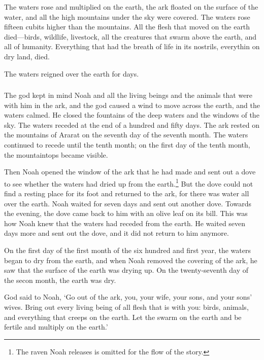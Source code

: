 The waters rose and multiplied on the earth,
the ark floated on the surface of the water,
and all the high mountains under the sky were covered.
The waters rose fifteen cubits higher than the mountains. 
All the flesh that moved on the earth died---birds,
wildlife, livestock, all the creatures that swarm above the earth,
and all of humanity.
Everything that had the breath of life in its nostrils, 
everythin on dry land,
died.

The waters reigned over the earth for  days.


\subsubsection{\secsep}

The god kept in mind Noah and all the living beings 
and the animals that were with him in the ark,
and the god caused a wind to move across the earth,
and the waters calmed.
He closed the fountains of the deep waters 
and the windows of the sky.
The waters receded at the end of a hundred and fifty days. 
The ark rested on the mountains of Ararat 
on the seventh day of the seventh month.
The waters continued to recede until the tenth month;
on the first day of the tenth month, 
the mountaintops became visible.

Then Noah opened the window of the ark that he had made
and sent out a dove to see 
whether the waters had dried up from the earth.\footnote{The raven Noah releases is omitted for the flow of the story.}
But the dove could not find a resting place for its foot
and returned to the ark, 
for there was water all over the earth.
Noah waited for seven days and sent out another dove.
Towards the evening,
the dove came back to him with an olive leaf on its bill.
This was how Noah knew that the waters had receded from the earth.
He waited seven days more and sent out the dove,
and it did not return to him anymore. 

On the first day of the first month of the six hundred and first year,
the waters began to dry from the earth,
and when Noah removed the covering of the ark,
he saw that the surface of the earth was drying up. 
On the twenty-seventh day of the secon month,
the earth was dry.

God said to Noah, 
`Go out of the ark, you, your wife, your sons, and your sons' wives.
Bring out every living being of all flesh that is with you:
birds, animals, and everything that creeps on the earth.
Let the swarm on the earth and be fertile and multiply on the earth.'

